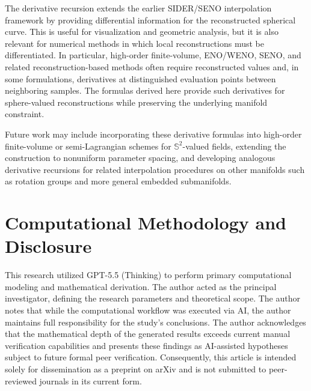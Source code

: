 \documentclass[a4paper,11pt]{article}
\numberwithin{equation}{section}
\theoremstyle{plain}
\theoremstyle{definition}
\theoremstyle{remark}
\newcommand{\Sph}{\mathbb{S}^2}
\begin{document}
The derivative recursion extends the earlier SIDER/SENO interpolation framework \cite{fonleu23} by providing differential information for the reconstructed spherical curve.  This is useful for visualization and geometric analysis, but it is also relevant for numerical methods in which local reconstructions must be differentiated.  In particular, high-order finite-volume, ENO/WENO, SENO, and related reconstruction-based methods often require reconstructed values and, in some formulations, derivatives at distinguished evaluation points between neighboring samples.  The formulas derived here provide such derivatives for sphere-valued reconstructions while preserving the underlying manifold constraint.

Future work may include incorporating these derivative formulas into high-order finite-volume or semi-Lagrangian schemes for \(\Sph\)-valued fields, extending the construction to nonuniform parameter spacing, and developing analogous derivative recursions for related interpolation procedures on other manifolds such as rotation groups and more general embedded submanifolds.

\section*{Computational Methodology and Disclosure}

This research utilized GPT-5.5 (Thinking) to perform primary computational modeling and mathematical derivation. The author acted as the principal investigator, defining the research parameters and theoretical scope. The author notes that while the computational workflow was executed via AI, the author maintains full responsibility for the study's conclusions. The author acknowledges that the mathematical depth of the generated results exceeds current manual verification capabilities and presents these findings as AI-assisted hypotheses subject to future formal peer verification. Consequently, this article is intended solely for dissemination as a preprint on arXiv and is not submitted to peer-reviewed journals in its current form.



\end{document}
